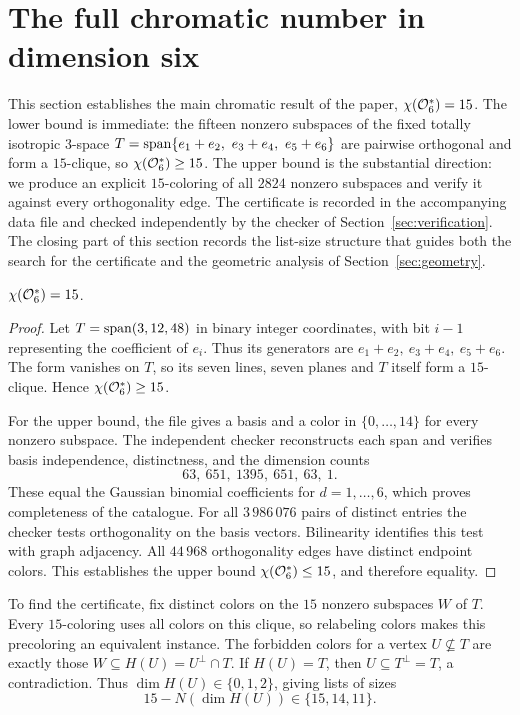 \section{The full chromatic number in dimension six}
\label{sec:chromatic}
This section establishes the main chromatic result of the paper,
\(\chi(\mathcal O_6^*)=15\).  The lower bound is immediate: the fifteen
nonzero subspaces of the fixed totally isotropic \(3\)-space
\(T=\Span\{e_1+e_2,\ e_3+e_4,\ e_5+e_6\}\) are pairwise orthogonal
and form a \(15\)-clique, so \(\chi(\mathcal O_6^*)\ge 15\).  The upper
bound is the substantial direction: we produce an explicit
\(15\)-coloring of all \(2824\) nonzero subspaces and verify it
against every orthogonality edge.  The certificate is recorded in
the accompanying data file and checked independently by the checker
of Section~\ref{sec:verification}.  The closing part of this
section records the list-size structure that guides both the search
for the certificate and the geometric analysis of
Section~\ref{sec:geometry}.
\begin{theorem}\label{thm:chromatic}
\(\chi(\mathcal O_6^*)=15\).
\end{theorem}

\begin{proof}
Let \(T=\operatorname{span}(3,12,48)\) in binary integer coordinates, with bit
\(i-1\) representing the coefficient of \(e_i\).  Thus its generators
are \(e_1+e_2,\ e_3+e_4,\ e_5+e_6\).  The form vanishes on \(T\), so
its seven lines, seven planes and \(T\) itself form a \(15\)-clique.
Hence \(\chi(\mathcal O_6^*)\ge15\).

For the upper bound, the file
 gives a basis and a color in
\(\{0,\ldots,14\}\) for every nonzero subspace.  The independent
checker reconstructs each span and verifies basis independence,
distinctness, and the dimension counts
\[
63,\ 651,\ 1395,\ 651,\ 63,\ 1 .
\]
These equal the Gaussian binomial coefficients for \(d=1,\dots,6\),
which proves completeness of the catalogue.  For all \(3\,986\,076\)
pairs of distinct entries the checker tests orthogonality on the
basis vectors.  Bilinearity identifies this test with graph
adjacency.  All \(44\,968\) orthogonality edges have distinct
endpoint colors.  This establishes the upper bound
\(\chi(\mathcal O_6^*)\le15\), and therefore equality.
\end{proof}

\begin{remark}\label{rem:precoloring}
To find the certificate, fix distinct colors on the \(15\) nonzero
subspaces \(W\) of \(T\).  Every \(15\)-coloring uses all colors on
this clique, so relabeling colors makes this precoloring an
equivalent instance.  The forbidden colors for a vertex
\(U\not\subseteq T\) are exactly those \(W\subseteq H(U)=U^\perp\cap
T\).  If \(H(U)=T\), then \(U\subseteq T^\perp=T\), a contradiction.
Thus \(\dim H(U)\in\{0,1,2\}\), giving lists of sizes
\[
15-N(\dim H(U))\in\{15,14,11\} .
\]
\end{remark}

